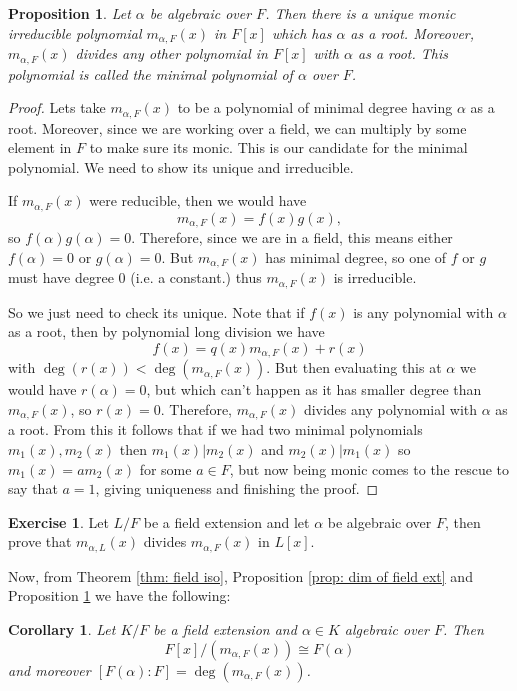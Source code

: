 \documentclass[11pt,a4paper]{report}
\theoremstyle{plain}
\newtheorem{cor}[subsection]{Corollary}
\newtheorem{prop}[subsection]{Proposition}
\theoremstyle{definition}
\theoremstyle{definition}
\newtheorem{question}[subsection]{Exercise}
\def \a{\alpha}
\begin{document}
	\begin{prop}\label{prop: min pol}
		Let $\a$ be algebraic over $F$. Then there is a unique monic irreducible polynomial $m_{\a,F}(x)$ in $F[x]$ which has $\a$ as a root. Moreover, $m_{\a,F}(x)$ divides any other polynomial in $F[x]$ with $\a$ as a root.  This polynomial is called the minimal polynomial of $\a$ over $F$.
	\end{prop}
	
	
	\begin{proof}
		Lets take $m_{\a,F}(x)$ to be a polynomial of minimal degree having $\a$ as a root. Moreover, since we are working over a field, we can multiply by some element in $F$ to make sure its monic. This is our candidate for the minimal polynomial. We need to show its unique and irreducible.
		
		If $m_{\a,F}(x)$ were reducible, then we would have \[m_{\a,F}(x)=f(x)g(x),\] so $f(\a)g(\a)=0$. Therefore, since we are in a field, this means either $f(\a)=0$ or $g(\a)=0$. But $m_{\a,F}(x)$ has minimal degree, so one of $f$ or $g$ must have degree $0$ (i.e. a constant.) thus $m_{\a,F}(x)$ is irreducible.
		
		So we just need to check its unique. Note that if $f(x)$ is any polynomial with $\a$ as a root, then by polynomial long division we have \[f(x)=q(x)m_{\a,F}(x)+r(x)\] with $\deg(r(x))< \deg(m_{\a,F}(x))$. But then evaluating this at $\a$ we would have $r(\a)=0$, but which can't happen as it has smaller degree than $m_{\a,F}(x)$, so $r(x)=0$. Therefore, $m_{\a,F}(x)$ divides any polynomial with $\a$ as a root. From this it follows that if we had two minimal polynomials $m_1(x),m_2(x)$ then $m_1(x)|m_2(x)$ and $m_2(x)|m_1(x)$ so $m_1(x)=a m_2(x)$ for some $a \in F$, but now being monic comes to the rescue to say that $a=1$, giving uniqueness and finishing the proof.
	\end{proof}
	
	
	
	\begin{question}
		Let $L/F$ be a field extension and let $\a$ be algebraic over  $F$, then prove that $m_{\a,L}(x)$ divides $m_{\a,F}(x)$ in $L[x]$.
	\end{question}
	
	
	
	Now, from Theorem \ref{thm: field iso}, Proposition \ref{prop: dim of field ext} and Proposition \ref{prop: min pol} we have the following:
	
	\begin{cor}\label{cor: min pol simple ext}
		Let $K/F$ be a field extension and $\a \in K$ algebraic over $F$. Then \[F[x]/(m_{\a,F}(x)) \cong F(\a)\] and moreover $[F(\a):F]=\deg(m_{\a,F}(x))$.
	\end{cor}
	
\end{document}
